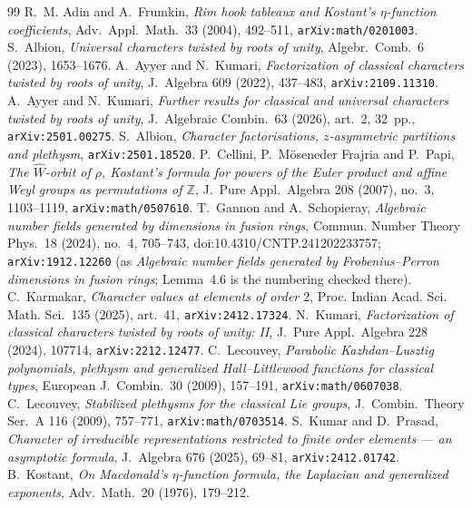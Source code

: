 \documentclass[11pt,a4paper]{article}
\theoremstyle{definition}
\newcommand{\ZZ}{\mathbb{Z}}
\begin{document}
\begin{thebibliography}{99}\small
{} R.~M. Adin and A.~Frumkin, \emph{Rim hook tableaux and Kostant's $\eta$-function
coefficients}, Adv.~Appl.~Math.~33 (2004), 492--511, \texttt{arXiv:math/0201003}.
 S.~Albion, \emph{Universal characters twisted by roots of unity}, Algebr.~Comb.~6
(2023), 1653--1676.
 A.~Ayyer and N.~Kumari, \emph{Factorization of classical characters twisted by roots
of unity}, J.~Algebra 609 (2022), 437--483, \texttt{arXiv:2109.11310}.
 A.~Ayyer and N.~Kumari, \emph{Further results for classical and universal characters
twisted by roots of unity}, J.~Algebraic Combin.~63 (2026), art.~2, 32~pp., \texttt{arXiv:2501.00275}.
 S.~Albion, \emph{Character factorisations, $z$-asymmetric partitions and plethysm},
\texttt{arXiv:2501.18520}.
 P.~Cellini, P.~M\"oseneder Frajria and P.~Papi, \emph{The $\widehat W$-orbit of
$\rho$, Kostant's formula for powers of the Euler product and affine Weyl groups as permutations of
$\ZZ$}, J.~Pure Appl.~Algebra 208 (2007), no.~3, 1103--1119, \texttt{arXiv:math/0507610}.
 T.~Gannon and A.~Schopieray, \emph{Algebraic number fields generated by dimensions in fusion rings}, Commun. Number Theory Phys.~18 (2024), no.~4, 705--743, doi:10.4310/CNTP.241202233757; \texttt{arXiv:1912.12260} (as \emph{Algebraic number fields generated by Frobenius--Perron dimensions in fusion rings}; Lemma~4.6 is the numbering checked there).
 C.~Karmakar, \emph{Character values at elements of order $2$},
Proc. Indian Acad. Sci. Math. Sci.~135 (2025), art.~41, \texttt{arXiv:2412.17324}.
 N.~Kumari, \emph{Factorization of classical characters twisted by roots of unity:
II}, J.~Pure Appl.~Algebra 228 (2024), 107714, \texttt{arXiv:2212.12477}.
 C.~Lecouvey, \emph{Parabolic Kazhdan--Lusztig polynomials, plethysm and generalized
Hall--Littlewood functions for classical types}, European J.~Combin.~30 (2009), 157--191, \texttt{arXiv:math/0607038}.
 C.~Lecouvey, \emph{Stabilized plethysms for the classical Lie groups},
J.~Combin.~Theory Ser.~A 116 (2009), 757--771, \texttt{arXiv:math/0703514}.
 S.~Kumar and D.~Prasad, \emph{Character of irreducible representations restricted
to finite order elements --- an asymptotic formula}, J.~Algebra 676 (2025), 69--81, \texttt{arXiv:2412.01742}.
 B.~Kostant, \emph{On Macdonald's $\eta$-function formula, the Laplacian and
generalized exponents}, Adv.~Math.~20 (1976), 179--212.

\end{thebibliography}
\end{document}
